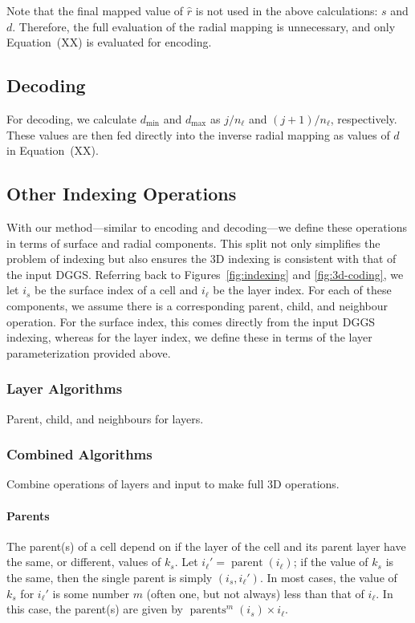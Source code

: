 Note that the final mapped value of $\hat{r}$ is not used in the above calculations: $s$ and $d$.
Therefore, the full evaluation of the radial mapping is unnecessary, and only Equation~(XX) is evaluated for encoding.


\subsection{Decoding}
For decoding, we calculate $d_\mathrm{min}$ and $d_\mathrm{max}$ as $j/n_\ell$ and $(j+1)/n_\ell$, respectively.
These values are then fed directly into the inverse radial mapping as values of $d$ in Equation~(XX).

\subsection{Other Indexing Operations}
With our method---similar to encoding and decoding---we define these operations in terms of surface and radial components.
This split not only simplifies the problem of indexing but also ensures the 3D indexing is consistent with that of the input DGGS.
Referring back to Figures~\ref{fig:indexing} and \ref{fig:3d-coding}, we let $i_s$ be the surface index of a cell and $i_\ell$ be the layer index.
For each of these components, we assume there is a corresponding parent, child, and neighbour operation.
For the surface index, this comes directly from the input DGGS indexing, whereas for the layer index, we define these in terms of the layer parameterization provided above.


\subsubsection{Layer Algorithms}
Parent, child, and neighbours for layers.


\subsubsection{Combined Algorithms}
Combine operations of layers and input to make full 3D operations.


\paragraph{Parents}
The parent(s) of a cell depend on if the layer of the cell and its parent layer have the same, or different, values of $k_s$.
Let $i_\ell' = \operatorname{parent}(i_\ell)$; if the value of $k_s$ is the same, then the single parent is simply $(i_s, i_\ell')$.
In most cases, the value of $k_s$ for $i_\ell'$ is some number $m$ (often one, but not always) less than that of $i_\ell$.
In this case, the parent(s) are given by $\operatorname{parents}^m(i_s) \times i_\ell$.



